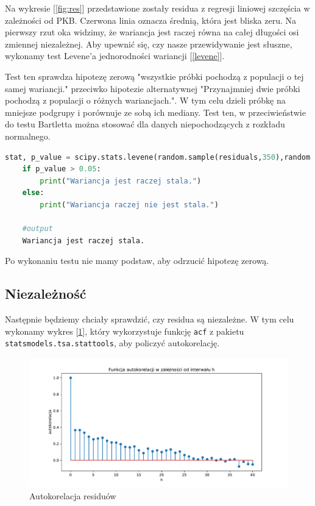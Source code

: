 \documentclass{article}
\theoremstyle{break}
\newcommand{\code}[1]{\colorbox{light-gray}{\texttt{#1}}}
\begin{document}
Na wykresie [\ref{fig:res}] przedstawione zostały residua z regresji liniowej szczęścia w zależności od PKB. Czerwona linia oznacza średnią, która jest bliska zeru. Na pierwszy rzut oka widzimy, że wariancja jest raczej równa na całej długości osi zmiennej niezależnej. Aby upewnić się, czy nasze przewidywanie jest słuszne, wykonamy test Levene'a jednorodności wariancji [\ref{levene}]. 

Test ten sprawdza hipotezę zerową "wszystkie próbki pochodzą z populacji o tej samej wariancji." przeciwko hipotezie alternatywnej "Przynajmniej dwie próbki pochodzą z populacji o różnych wariancjach.". W tym celu dzieli próbkę na mniejsze podgrupy i porównuje ze sobą ich mediany. Test ten, w przeciwieństwie do testu Bartletta można stosować dla danych niepochodzących z rozkładu normalnego.

\begin{lstlisting}[language=Python, caption=Test Levene'a, label={levene}]
	stat, p_value = scipy.stats.levene(random.sample(residuals,350),random.sample(residuals,350))
	if p_value > 0.05:
		print("Wariancja jest raczej stala.")
	else:
		print("Wariancja raczej nie jest stala.")
		
	#output
	Wariancja jest raczej stala.
\end{lstlisting}

Po wykonaniu testu nie mamy podstaw, aby odrzucić hipotezę zerową.

\subsection{Niezależność}

Następnie będziemy chciały sprawdzić, czy residua są niezależne. W tym celu wykonamy wykres [\ref{fig:acor}], który wykorzystuje funkcję \code{acf} z pakietu \code{statsmodels.tsa.stattools}, aby policzyć autokorelację.

\begin{figure}[H]
	\begin{center}
		\includegraphics[scale=0.5]{acor.pdf}
		\caption{Autokorelacja residuów}
		\label{fig:acor}
	\end{center}
\end{figure}
\end{document}
